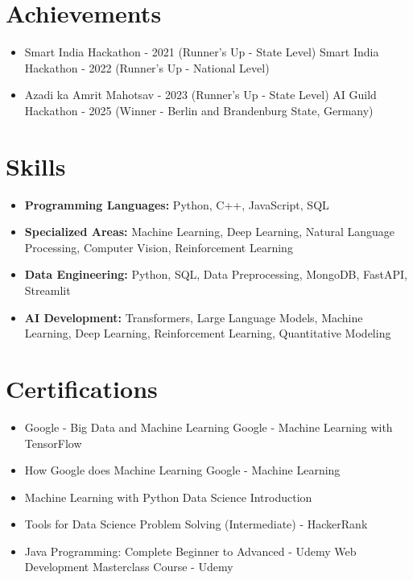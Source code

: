 \documentclass[a4paper,10pt]{article}
\begin{document}
\section*{Achievements}
\begin{itemize}
\item Smart India Hackathon - 2021 (Runner's Up - State Level) \hfill Smart India Hackathon - 2022 (Runner's Up - National Level)
\item Azadi ka Amrit Mahotsav - 2023 (Runner's Up - State Level) \hfill AI Guild Hackathon - 2025 (Winner - Berlin and Brandenburg State, Germany)
\end{itemize}

\section*{Skills}
\begin{itemize}
  \item \textbf{Programming Languages:} Python, C++, JavaScript, SQL
  \item \textbf{Specialized Areas:} Machine Learning, Deep Learning, Natural Language Processing, Computer Vision, Reinforcement Learning
  \item \textbf{Data Engineering:} Python, SQL, Data Preprocessing, MongoDB, FastAPI, Streamlit
  \item \textbf{AI Development:} Transformers, Large Language Models, Machine Learning, Deep Learning, Reinforcement Learning, Quantitative Modeling
\end{itemize}

\section*{Certifications}
\begin{itemize}
\item Google - Big Data and Machine Learning \hfill Google - Machine Learning with TensorFlow
\item How Google does Machine Learning \hfill Google - Machine Learning
\item Machine Learning with Python \hfill Data Science Introduction
\item Tools for Data Science \hfill Problem Solving (Intermediate) - HackerRank
\item Java Programming: Complete Beginner to Advanced - Udemy \hfill Web Development Masterclass Course - Udemy
\end{itemize}
\end{document}
